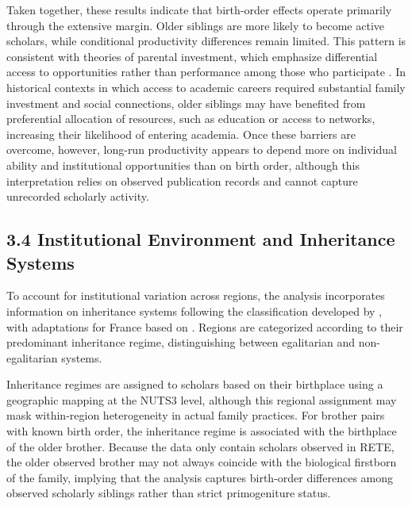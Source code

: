 Taken together, these results indicate that birth-order effects operate primarily through the extensive margin. Older siblings are more likely to become active scholars, while conditional productivity differences remain limited. This pattern is consistent with theories of parental investment, which emphasize differential access to opportunities rather than performance among those who participate \citep{Becker1976, Hotz2015}. In historical contexts in which access to academic careers required substantial family investment and social connections, older siblings may have benefited from preferential allocation of resources, such as education or access to networks, increasing their likelihood of entering academia. Once these barriers are overcome, however, long-run productivity appears to depend more on individual ability and institutional opportunities than on birth order, although this interpretation relies on observed publication records and cannot capture unrecorded scholarly activity.


\FloatBarrier

\subsection*{3.4 Institutional Environment and Inheritance Systems}

To account for institutional variation across regions, the analysis incorporates information on inheritance systems following the classification developed by \cite{Todd1990}, with adaptations for France based on \cite{Gobbi2024}. Regions are categorized according to their predominant inheritance regime, distinguishing between egalitarian and non-egalitarian systems.

Inheritance regimes are assigned to scholars based on their birthplace using a geographic mapping at the NUTS3 level, although this regional assignment may mask within-region heterogeneity in actual family practices. For brother pairs with known birth order, the inheritance regime is associated with the birthplace of the older brother. Because the data only contain scholars observed in RETE, the older observed brother may not always coincide with the biological firstborn of the family, implying that the analysis captures birth-order differences among observed scholarly siblings rather than strict primogeniture status.

